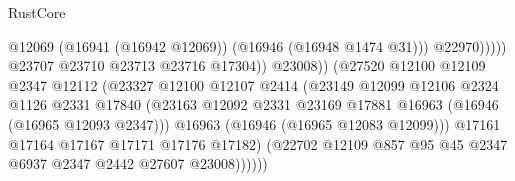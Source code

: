 \begin{lexlean}{RustCore}
\begin{coremodule}
                                                        @12069
                                                        (@16941 (@16942 @12069))
                                                        (@16946 (@16948 @1474 @31)))
                                                      @22970)))))
                                            @23707
                                            @23710
                                            @23713
                                            @23716
                                            @17304))
                                        @23008))
                                    (@27520
                                      @12100
                                      @12109
                                      @2347
                                      @12112
                                      (@23327
                                        @12100
                                        @12107
                                        @2414
                                        (@23149
                                          @12099
                                          @12106
                                          @2324
                                          @1126
                                          @2331
                                          @17840
                                          (@23163
                                            @12092
                                            @2331
                                            @23169
                                            @17881
                                            @16963
                                            (@16946 (@16965 @12093 @2347)))
                                          @16963
                                          (@16946 (@16965 @12083 @12099)))
                                        @17161
                                        @17164
                                        @17167
                                        @17171
                                        @17176
                                        @17182)
                                      (@22702
                                        @12109
                                        @857
                                        @95
                                        @45
                                        @2347
                                        @6937
                                        @2347
                                        @2442
                                        @27607
                                        @23008))))))

\end{coremodule}
\end{lexlean}
